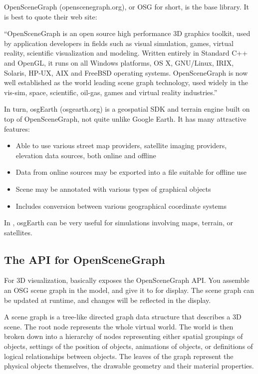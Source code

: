 OpenSceneGraph (openscenegraph.org), or OSG for short, is the base library.
It is best to quote their web site:

\begin{displayquote}
``OpenSceneGraph is an open source high performance 3D graphics toolkit,
used by application developers in fields such as visual simulation, games,
virtual reality, scientific visualization and modeling. Written entirely in
Standard C++ and OpenGL, it runs on all Windows platforms, OS X, GNU/Linux,
IRIX, Solaris, HP-UX, AIX and FreeBSD operating systems. OpenSceneGraph is
now well established as the world leading scene graph technology, used
widely in the vis-sim, space, scientific, oil-gas, games and virtual
reality industries.''
\end{displayquote}

In turn, osgEarth (osgearth.org) is a geospatial SDK and terrain engine built on top
of OpenSceneGraph, not quite unlike Google Earth. It has many attractive features:

\begin{itemize}
\item Able to use various street map providers, satellite imaging providers,
      elevation data sources, both online and offline
\item Data from online sources may be exported into a file suitable for offline use
\item Scene may be annotated with various types of graphical objects
\item Includes conversion between various geographical coordinate systems
\end{itemize}

In \opp, osgEarth can be very useful for simulations involving maps, terrain,
or satellites.

\subsection{The {\opp} API for OpenSceneGraph}

For 3D visualization, {\opp} basically exposes the OpenSceneGraph API.
You assemble an OSG scene graph in the model, and give it to {\opp} for
display. The scene graph can be updated at runtime, and changes will be
reflected in the display.

\begin{note}
 A scene graph is a tree-like directed graph
data structure that describes a 3D scene. The root node represents the
whole virtual world. The world is then broken down into a hierarchy of
nodes representing either spatial groupings of objects, settings of
the position of objects, animations of objects, or definitions of
logical relationships between objects. The leaves of the graph
represent the physical objects themselves, the drawable geometry and
their material properties.
\end{note}

